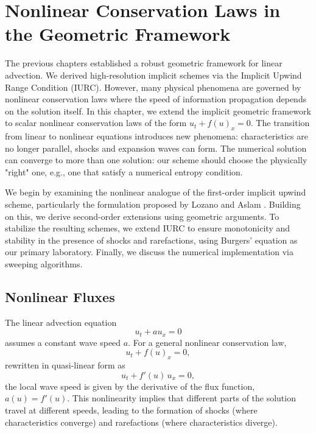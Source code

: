 \chapter{Nonlinear Conservation Laws in the Geometric Framework}
\label{sec:nonlinear-conservation-laws}

The previous chapters established a robust geometric framework for linear advection.
We derived high-resolution implicit schemes via the Implicit Upwind Range Condition (IURC).
However, many physical phenomena are governed by nonlinear conservation laws where the speed of information propagation depends on the solution itself.
In this chapter, we extend the implicit geometric framework to scalar nonlinear conservation laws of the form \(u_t + f(u)_x = 0\).
The transition from linear to nonlinear equations introduces new phenomena: characteristics are no longer parallel, shocks and expansion waves can form.
The numerical solution can converge to more than one solution: our scheme should choose the physically "right" one, e.g., one that satisfy a numerical entropy condition.

We begin by examining the nonlinear analogue of the first-order implicit upwind scheme, particularly the formulation proposed by Lozano and Aslam \cite{lozano2020implicit}.
Building on this, we derive second-order extensions using geometric arguments.
To stabilize the resulting schemes, we extend IURC to ensure monotonicity and stability in the presence of shocks and rarefactions, using Burgers' equation as our primary laboratory.
Finally, we discuss the numerical implementation via sweeping algorithms.

\section{Nonlinear Fluxes}
\label{sec:nonlinear_fluxes}

The linear advection equation
\begin{equation}
    u_t + a u_x = 0
\end{equation}
assumes a constant wave speed \(a\).
For a general nonlinear conservation law,
\begin{equation}
    \label{eq:nonlinear_cons}
    u_t + f(u)_x = 0,
\end{equation}
rewritten in quasi-linear form as
\begin{equation}
    \label{eq:claw_quasi_lin}
    u_t + f'(u)\,u_x = 0,
\end{equation}
the local wave speed is given by the derivative of the flux function, \(a(u) = f'(u)\).
This nonlinearity implies that different parts of the solution travel at different speeds, leading to the formation of shocks (where characteristics converge) and rarefactions (where characteristics diverge).

